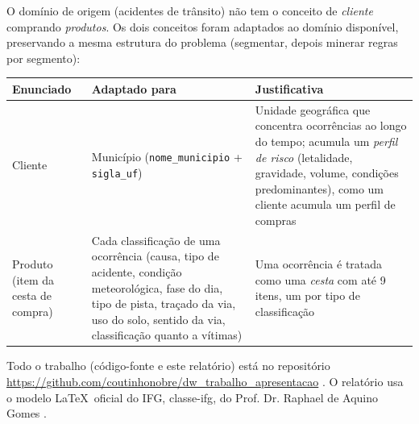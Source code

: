 O domínio de origem (acidentes de trânsito) não tem o conceito de
\textit{cliente} comprando \textit{produtos}. Os dois conceitos foram
adaptados ao domínio disponível, preservando a mesma estrutura do problema
(segmentar, depois minerar regras por segmento):

\begin{quadro}[!ht]
  \centering
  \small
  \caption{Adaptação dos conceitos do enunciado ao domínio PRF-DATATRAN}
  \label{qua:adaptacao}
  \begin{tabular}{|p{2.6cm}|p{5.2cm}|p{6.2cm}|}
    \hline
    \textbf{Enunciado} & \textbf{Adaptado para} & \textbf{Justificativa} \\
    \hline
    Cliente &
    Município (\texttt{nome\_municipio} + \texttt{sigla\_uf}) &
    Unidade geográfica que concentra ocorrências ao longo do tempo; acumula
    um \textit{perfil de risco} (letalidade, gravidade, volume, condições
    predominantes), como um cliente acumula um perfil de compras \\
    \hline
    Produto (item da cesta de compra) &
    Cada classificação de uma ocorrência (causa, tipo de acidente, condição
    meteorológica, fase do dia, tipo de pista, traçado da via, uso do solo,
    sentido da via, classificação quanto a vítimas) &
    Uma ocorrência é tratada como uma \textit{cesta} com até 9 itens, um por
    tipo de classificação \\
    \hline
  \end{tabular}
\end{quadro}

Todo o trabalho (código-fonte e este relatório) está no repositório
\url{https://github.com/coutinhonobre/dw_trabalho_apresentacao}
\cite{repotrabalho}. O relatório usa o modelo \LaTeX\ oficial do IFG,
\textsf{classe-ifg}, do Prof. Dr. Raphael de Aquino Gomes
\cite{classeifg}.
